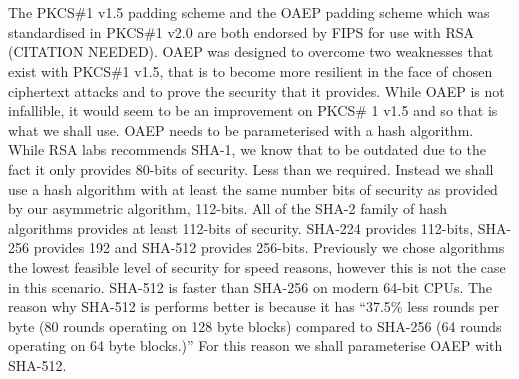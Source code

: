 \documentclass[12pt, titlepage]{article}
\begin{document}
\\
\\
The PKCS\#1 v1.5 padding scheme and the OAEP padding scheme which was standardised in PKCS\#1 v2.0 are both endorsed by FIPS for use with RSA (CITATION NEEDED). OAEP was designed to overcome two weaknesses that exist with PKCS\#1 v1.5, that is to become more resilient in the face of chosen ciphertext attacks and to prove the security that it provides. While OAEP is not infallible\cite{oaepAttack}, it would seem to be an improvement on PKCS\# 1 v1.5 and so that is what we shall use.
\newline \indent OAEP needs to be parameterised with a hash algorithm. While RSA labs recommends SHA-1, we know that to be outdated due to the fact it only provides 80-bits of security. Less than we required. Instead we shall use a hash algorithm with at least the same number bits of security as provided by  our asymmetric algorithm, 112-bits. All of the SHA-2 family of hash algorithms provides at least 112-bits of security. SHA-224 provides 112-bits, SHA-256 provides 192 and SHA-512 provides 256-bits. Previously we chose algorithms the lowest feasible level of security for speed reasons, however this is not the case in this scenario. SHA-512 is faster than SHA-256 on modern 64-bit CPUs. The reason why SHA-512 is performs better is because it has ``37.5\% less rounds per byte (80 rounds operating on 128 byte blocks) compared to SHA-256 (64 rounds operating on 64 byte blocks.)''\cite{sha512Faster} For this reason we shall parameterise OAEP with SHA-512.
\end{document}
